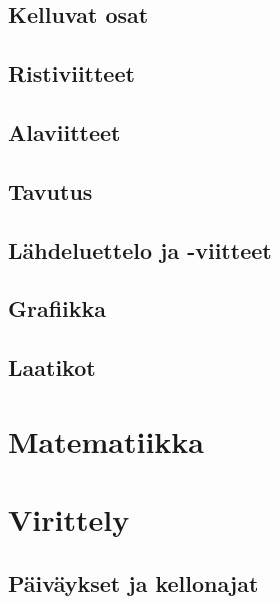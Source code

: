 \documentclass[notitlepage,oneside]{book}
\begin{document}
\section{Kelluvat osat}
\section{Ristiviitteet}
\section{Alaviitteet}
\section{Tavutus}
\section{Lähdeluettelo ja -viitteet}
\section{Grafiikka}
\section{Laatikot}

\chapter{Matematiikka}

\chapter{Virittely}
\section{Päiväykset ja kellonajat}
\end{document}
